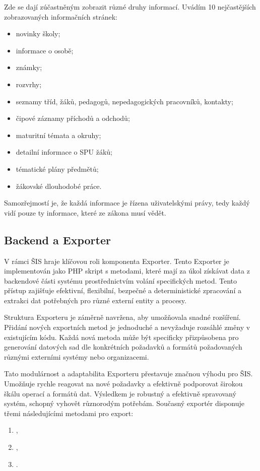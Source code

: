 \documentclass[FM,Proj]{tulthesis}
\begin{document}
Zde se dají zúčastněným zobrazit různé druhy informací. Uvádím 10 nejčastějších zobrazovaných
informačních stránek:
\begin{itemize}
    \item novinky školy;
    \item informace o osobě;
    \item známky;
    \item rozvrhy;
    \item seznamy tříd, žáků, pedagogů, nepedagogických pracovníků, kontakty;
    \item čipové záznamy příchodů a odchodů;
    \item maturitní témata a okruhy;
    \item detailní informace o SPU žáků;
    \item tématické plány předmětů;
    \item žákovské dlouhodobé práce.
\end{itemize}
Samozřejmostí je, že každá informace je řízena uživatelskými právy, tedy každý vidí pouze ty
informace, které ze zákona musí vědět.

\subsection{Backend a Exporter}
\label{section:backend-a-exporter}
V rámci ŠIS hraje klíčovou roli komponenta Exporter. Tento Exporter je implementován
jako PHP skript s metodami, které mají za úkol získávat data z backendové části 
systému prostřednictvím volání specifických metod. Tento přístup zajišťuje efektivní,
flexibilní, bezpečné a deterministické zpracování a extrakci dat potřebných pro různé
externí entity a procesy.

Struktura Exporteru je záměrně navržena, aby umožňovala snadné rozšíření. Přidání
nových exportních metod je jednoduché a nevyžaduje rozsáhlé změny v existujícím kódu.
Každá nová metoda může být specificky přizpůsobena pro generování datových sad
dle konkrétních požadavků a formátů požadovaných různými externími systémy nebo
organizacemi.

Tato modulárnost a adaptabilita Exporteru přestavuje značnou výhodu pro ŠIS. Umožňuje
rychle reagovat na nové požadavky a efektivně podporovat širokou škálu operací
a formátů dat. Výsledkem je robustný a efektivně spravovaný systém, schopný vyhovět
různorodým potřebám. Současný exportér disponuje třemi následujícími metodami
pro export:
\begin{enumerate}
    \item {},
    \item {},
    \item {}.
\end{enumerate}
\end{document}
